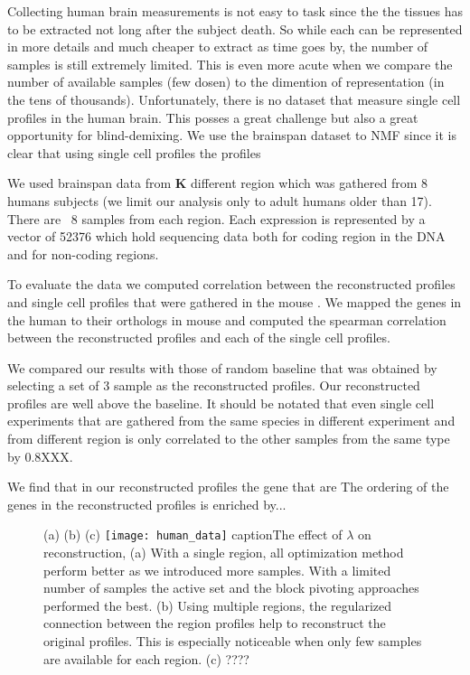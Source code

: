 



Collecting human brain measurements is not easy to task since the the tissues has to be extracted not long after the subject death. So while each can be represented in more details and much cheaper to extract as time goes by, the number of samples is still extremely limited. This is even more acute when we compare the number of available samples (few dosen) to the dimention of representation (in the tens of thousands).
Unfortunately, there is no dataset that measure single cell profiles in the human brain. This posses a great challenge but also a great opportunity for blind-demixing. 
We use the brainspan dataset \cite{brainspan} to 
NMF since it is clear that using single cell profiles the profiles


We used brainspan data from {\bf{K}} different region which was gathered from 8 humans subjects (we limit our analysis only to adult humans older than 17). There are ~8 samples from each region. Each expression is represented by a vector of 52376 which hold sequencing data both for coding region in the DNA and for non-coding regions. 

To evaluate the data we computed correlation between the reconstructed profiles and single cell profiles that were gathered in the mouse \cite{barres2014}. We mapped the genes in the human to their orthologs in mouse and computed the spearman correlation between the reconstructed profiles and each of the single cell profiles.

We compared our results with those of random baseline that was obtained by selecting a set of 3 sample as the reconstructed profiles. Our reconstructed profiles are well above the baseline. It should be notated that even single cell experiments that are gathered from the same species in different experiment and from different region is only correlated to the other samples from the same type by 0.8XXX. 

We find that in our reconstructed profiles the gene that are
The ordering of the genes in the reconstructed profiles is enriched by...





\begin{figure}[!hbt]
   (a) \hspace{120pt}(b) \hspace{120pt}(c) \hspace{120pt}
   \centering
     \texttt{[image: human\_data]}
     caption{The effect of $\lambda$ on reconstruction}, 
    (a)  With a single region, all optimization method perform better as we introduced more samples. With a limited number of samples the active set and the block pivoting approaches performed the best. (b) Using multiple regions, the regularized connection between the region profiles help to reconstruct the original profiles. This is especially noticeable when only few samples are available for each region. (c) ????
    \label{fig:controlled_exp}
\end{figure}
